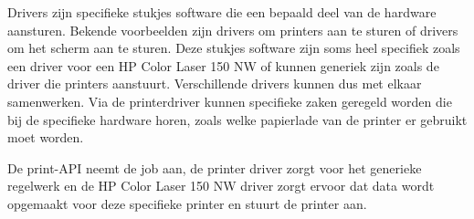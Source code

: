 Drivers zijn specifieke stukjes software die een bepaald deel van de hardware aansturen. Bekende voorbeelden zijn drivers om printers aan te sturen of drivers om het scherm aan te sturen. Deze stukjes software zijn soms heel specifiek zoals een driver voor een HP Color Laser 150 NW of kunnen generiek zijn zoals de driver die printers aanstuurt. Verschillende drivers kunnen dus met elkaar samenwerken. Via de printerdriver kunnen specifieke zaken geregeld worden die bij de specifieke hardware horen, zoals welke papierlade van de printer er gebruikt moet worden.

De print-API neemt de job aan, de printer driver zorgt voor het generieke regelwerk en de HP Color Laser 150 NW driver zorgt ervoor dat data wordt opgemaakt voor deze specifieke printer en stuurt de printer aan.

